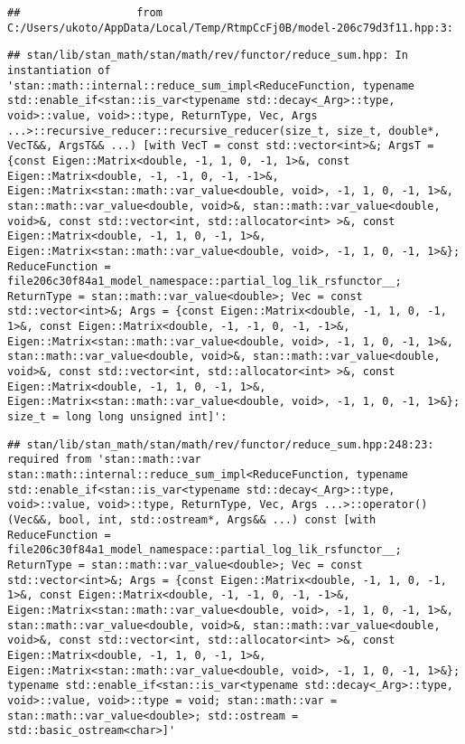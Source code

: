 \documentclass[
]{article}
\begin{document}
\begin{verbatim}
##                  from C:/Users/ukoto/AppData/Local/Temp/RtmpCcFj0B/model-206c79d3f11.hpp:3:
\end{verbatim}

\begin{verbatim}
## stan/lib/stan_math/stan/math/rev/functor/reduce_sum.hpp: In instantiation of 'stan::math::internal::reduce_sum_impl<ReduceFunction, typename std::enable_if<stan::is_var<typename std::decay<_Arg>::type, void>::value, void>::type, ReturnType, Vec, Args ...>::recursive_reducer::recursive_reducer(size_t, size_t, double*, VecT&&, ArgsT&& ...) [with VecT = const std::vector<int>&; ArgsT = {const Eigen::Matrix<double, -1, 1, 0, -1, 1>&, const Eigen::Matrix<double, -1, -1, 0, -1, -1>&, Eigen::Matrix<stan::math::var_value<double, void>, -1, 1, 0, -1, 1>&, stan::math::var_value<double, void>&, stan::math::var_value<double, void>&, const std::vector<int, std::allocator<int> >&, const Eigen::Matrix<double, -1, 1, 0, -1, 1>&, Eigen::Matrix<stan::math::var_value<double, void>, -1, 1, 0, -1, 1>&}; ReduceFunction = file206c30f84a1_model_namespace::partial_log_lik_rsfunctor__; ReturnType = stan::math::var_value<double>; Vec = const std::vector<int>&; Args = {const Eigen::Matrix<double, -1, 1, 0, -1, 1>&, const Eigen::Matrix<double, -1, -1, 0, -1, -1>&, Eigen::Matrix<stan::math::var_value<double, void>, -1, 1, 0, -1, 1>&, stan::math::var_value<double, void>&, stan::math::var_value<double, void>&, const std::vector<int, std::allocator<int> >&, const Eigen::Matrix<double, -1, 1, 0, -1, 1>&, Eigen::Matrix<stan::math::var_value<double, void>, -1, 1, 0, -1, 1>&}; size_t = long long unsigned int]':
\end{verbatim}

\begin{verbatim}
## stan/lib/stan_math/stan/math/rev/functor/reduce_sum.hpp:248:23:   required from 'stan::math::var stan::math::internal::reduce_sum_impl<ReduceFunction, typename std::enable_if<stan::is_var<typename std::decay<_Arg>::type, void>::value, void>::type, ReturnType, Vec, Args ...>::operator()(Vec&&, bool, int, std::ostream*, Args&& ...) const [with ReduceFunction = file206c30f84a1_model_namespace::partial_log_lik_rsfunctor__; ReturnType = stan::math::var_value<double>; Vec = const std::vector<int>&; Args = {const Eigen::Matrix<double, -1, 1, 0, -1, 1>&, const Eigen::Matrix<double, -1, -1, 0, -1, -1>&, Eigen::Matrix<stan::math::var_value<double, void>, -1, 1, 0, -1, 1>&, stan::math::var_value<double, void>&, stan::math::var_value<double, void>&, const std::vector<int, std::allocator<int> >&, const Eigen::Matrix<double, -1, 1, 0, -1, 1>&, Eigen::Matrix<stan::math::var_value<double, void>, -1, 1, 0, -1, 1>&}; typename std::enable_if<stan::is_var<typename std::decay<_Arg>::type, void>::value, void>::type = void; stan::math::var = stan::math::var_value<double>; std::ostream = std::basic_ostream<char>]'
\end{verbatim}
\end{document}
